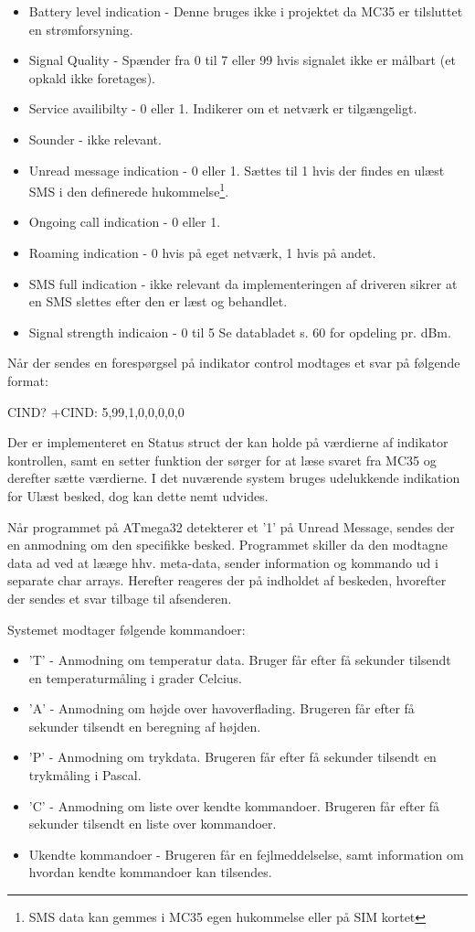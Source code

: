 \begin{itemize}
    \item Battery level indication - Denne bruges ikke i projektet da MC35 er tilsluttet en strømforsyning.
    \item Signal Quality - Spænder fra 0 til 7 eller 99 hvis signalet ikke er målbart (et opkald ikke foretages).
    \item Service availibilty - 0 eller 1. Indikerer om et netværk er tilgængeligt.
    \item Sounder  - ikke relevant.
    \item Unread message indication - 0 eller 1. Sættes til 1 hvis der findes en ulæst SMS i den 
    definerede hukommelse\footnote{SMS data kan gemmes i MC35 egen hukommelse eller på SIM kortet}.
    \item Ongoing call indication - 0 eller 1.
    \item Roaming indication - 0 hvis på eget netværk, 1 hvis på andet.
    \item SMS full indication - ikke relevant da implementeringen af driveren sikrer at en SMS slettes efter den er læst og behandlet.
    \item Signal strength indicaion - 0 til 5 Se databladet s. 60 for opdeling pr. dBm.
\end{itemize}

Når der sendes en forespørgsel på indikator control modtages et svar på følgende format:

CIND?
+CIND: 5,99,1,0,0,0,0,0

Der er implementeret en Status struct der kan holde på værdierne af indikator kontrollen, samt en setter funktion der sørger for at læse svaret fra MC35 og derefter sætte værdierne.
I det nuværende system bruges udelukkende indikation for Ulæst besked, dog kan dette nemt udvides.

Når programmet på ATmega32 detekterer et '1' på Unread Message, sendes der en anmodning om den specifikke besked. Programmet skiller da den modtagne data ad ved at lææge hhv. meta-data, sender information og kommando 
ud i separate char arrays. Herefter reageres der på indholdet af beskeden, hvorefter der sendes et svar tilbage til afsenderen.

Systemet modtager følgende kommandoer:

\begin{itemize}
    \item 'T' - Anmodning om temperatur data. Bruger får efter få sekunder tilsendt en temperaturmåling i grader Celcius.
    \item 'A' - Anmodning om højde over havoverflading. Brugeren får efter få sekunder tilsendt en beregning af højden.
    \item 'P' - Anmodning om trykdata. Brugeren får efter få sekunder tilsendt en trykmåling i Pascal.
    \item 'C' - Anmodning om liste over kendte kommandoer. Brugeren får efter få sekunder tilsendt en liste over kommandoer.
    \item Ukendte kommandoer - Brugeren får en fejlmeddelselse, samt information om hvordan kendte kommandoer kan tilsendes.
\end{itemize}

